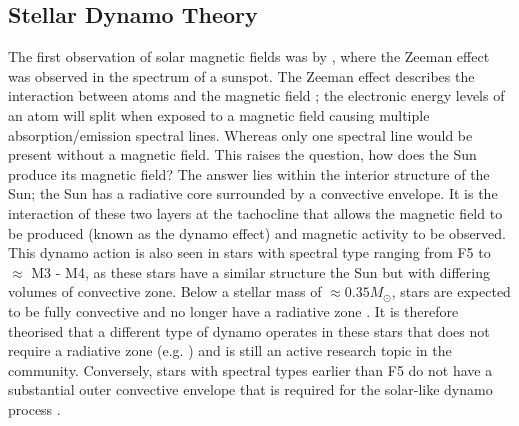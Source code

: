 \subsection{Stellar Dynamo Theory}
The first observation of solar magnetic fields was by \citet{Hale_1908}, where the Zeeman effect was observed in the spectrum of a sunspot. The Zeeman effect describes the interaction between atoms and the magnetic field \citep{Zeeman_1897}; the electronic energy levels of an atom will split when exposed to a magnetic field causing multiple absorption/emission spectral lines. Whereas only one spectral line would be present without a magnetic field. This raises the question, how does the Sun produce its magnetic field? The answer lies within the interior structure of the Sun; the Sun has a radiative core surrounded by a convective envelope. It is the interaction of these two layers at the tachocline that allows the magnetic field to be produced (known as the dynamo effect) and magnetic activity to be observed. This dynamo action is also seen in stars with spectral type ranging from F5 to $\approx$ M3 - M4, as these stars have a similar structure the Sun but with differing volumes of convective zone. Below a stellar mass of $\approx 0.35 M_{\odot}$, stars are expected to be fully convective and no longer have a radiative zone \citep{Chabrier_1997}. It is therefore theorised that a different type of dynamo operates in these stars that does not require a radiative zone (e.g. \citealt{Durney_etal_1993}) and is still an active research topic in the community. Conversely, stars with spectral types earlier than F5 do not have a substantial outer convective envelope that is required for the solar-like dynamo process \citep{Pinsonneault_etal_2001}.

